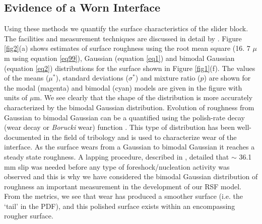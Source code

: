 \documentclass[preprint,1p, 10pt,authoryear]{elsarticle}
\begin{document}
\subsection{Evidence of a Worn Interface}
\label{SurfaceWear}
Using these methods we quantify the surface characteristics of the slider block. The facilities and measurement techniques are discussed in detail by \citet{Selvadurai2017}.  Figure \ref{fig2}(a) shows estimates of surface roughness using the root mean square (16. 7 $\mu$m using equation \eqref{eq99}), Gaussian (equation \eqref{eq1}) and bimodal Gaussian (equation \eqref{eq2}) distributions for the surface shown in Figure \ref{fig1}(f). The values of the means ($\mu^{*}$), standard deviations ($\sigma^{*}$) and mixture ratio ($p$) are shown for the modal (magenta) and bimodal (cyan) models are given in the figure with units of $\mu$m.  We see clearly that the shape of the distribution is more accurately characterized by the bimodal Gaussian distribution.  Evolution of roughness from Gaussian to bimodal Gaussian can be a quantified using the polish-rate decay (wear decay or \textit{Borucki} wear) function \citep{Borucki2002, Borucki2004, Ciavarella2016}. This type of distribution has been well-documented in the field of tribology and is used to characterize wear of the interface. As the surface wears from a Gaussian to bimodal Gaussian it reaches a steady state roughness.  A lapping procedure, described in \citet{Selvadurai2015}, detailed that $\sim$ 36.1 mm slip was needed before any type of foreshock/nucleation activity was observed and this is why we have considered the bimodal Gaussian distribution of roughness an important measurement in the development of our RSF model.  From the metrics, we see that wear has produced a smoother surface (i.e.  the `tail' in the PDF), and this polished surface exists within an encompassing rougher surface.     
\end{document}
